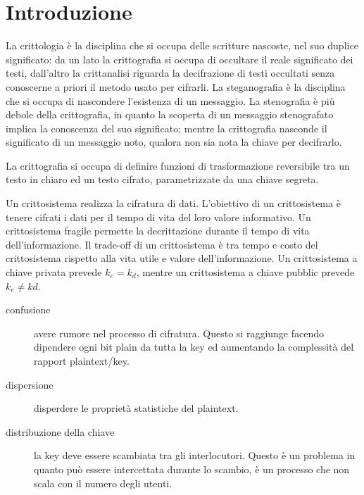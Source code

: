 \chapter{Introduzione}
\label{chp:introduction}

La crittologia è la disciplina che si occupa delle scritture nascoste, nel suo duplice significato: da un lato la crittografia si occupa di occultare il reale significato dei testi, dall'altro la crittanalisi riguarda la decifrazione di testi occultati senza conoscerne a priori il metodo usato per cifrarli.
La steganografia è la disciplina che si occupa di nascondere l'esistenza di un messaggio. La stenografia è più debole della crittografia, in quanto la scoperta di un messaggio stenografato implica la conoscenza del suo significato; mentre la crittografia nasconde il significato di un messaggio noto, qualora non sia nota la chiave per decifrarlo.

La crittografia si occupa di definire funzioni di trasformazione reversibile tra un testo in chiaro ed un testo cifrato, parametrizzate da una chiave segreta.



Un crittosistema realizza la cifratura di dati. L'obiettivo di un crittosistema è tenere cifrati i dati per il tempo di vita del loro valore informativo. Un crittosistema fragile permette la decrittazione durante il tempo di vita dell'informazione. Il trade-off di un crittosistema è tra tempo e costo del crittosistema rispetto alla vita utile e valore dell'informazione.
Un crittosistema a chiave privata prevede $k_{e}=k_{d}$, mentre un crittosistema a chiave pubblic prevede $k_{e}\neq k{d}$.

\begin{description}
  \item[confusione] avere rumore nel processo di cifratura. Questo si raggiunge facendo dipendere ogni bit plain da tutta la key ed aumentando la complessità del rapport plaintext/key.
  \item[dispersione] disperdere le proprietà statistiche del plaintext.
  \item[distribuzione della chiave] la key deve essere scambiata tra gli interlocutori. Questo è un problema in quanto può essere intercettata durante lo scambio, è un processo che non scala con il numero degli utenti.
\end{description}

